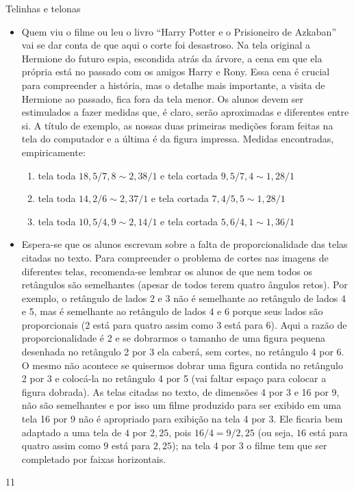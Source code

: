 \begin{sugestions}{Telinhas e telonas}
{
\begin{itemize}
\item Quem viu o filme ou leu o livro “Harry Potter e o Prisioneiro de Azkaban” vai se dar conta de que aqui o corte foi desastroso. Na tela original a Hermione do futuro espia, escondida atrás da árvore, a cena em que ela própria está no passado com os amigos Harry e Rony. Essa cena é crucial para compreender a história, mas o detalhe mais importante, a visita de Hermione ao passado, fica fora da tela menor. Os alunos devem ser estimulados a fazer medidas que, é claro, serão aproximadas e diferentes entre si. A título de exemplo, as nossas duas primeiras medições foram feitas na tela do computador e a última é da figura impressa. Medidas encontradas, empiricamente: 
\begin{enumerate}
\item tela toda $18{,}5/7{,}8\sim2{,}38/1$ e tela cortada $9{,}5/7{,}4\sim1{,}28/1$
\item tela toda $14{,}2/6\sim2{,}37/1$ e tela cortada $7{,}4/5{,}5\sim1{,}28/1$
\item tela toda $10{,}5/4{,}9\sim2{,}14/1$ e tela cortada $5{,}6/4{,}1\sim1{,}36/1$
\end{enumerate}

\item Espera-se que os alunos escrevam sobre a falta de proporcionalidade das telas citadas no texto. Para compreender o problema de cortes nas imagens de diferentes telas, recomenda-se lembrar os alunos de que nem todos os retângulos são semelhantes (apesar de todos terem quatro ângulos retos). Por exemplo, o retângulo de lados 2 e 3 não é semelhante ao retângulo de lados 4 e 5, mas é semelhante ao retângulo de lados 4 e 6 porque seus lados são proporcionais (2 está para quatro assim como 3 está para 6). Aqui a razão de proporcionalidade é 2 e se dobrarmos o tamanho de uma figura pequena desenhada no retângulo 2 por 3 ela caberá, sem cortes, no retângulo 4 por 6. O mesmo não acontece se quisermos dobrar uma figura contida no retângulo 2 por 3 e colocá-la no retângulo 4 por 5 (vai faltar espaço para colocar a figura dobrada). As telas citadas no texto, de dimensões 4 por 3 e 16 por 9, não são semelhantes e por isso um filme produzido para ser exibido em uma tela 16 por 9 não é apropriado para exibição na tela 4 por 3. Ele ficaria bem adaptado a uma tela de $4$ por $2{,}25$, pois $16/4=9/2{,}25$ (ou seja, $16$ está para quatro assim como $9$ está para $2{,}25$); na tela 4 por 3 o filme tem que ser completado por faixas horizontais.   
\end{itemize}
}{1}{1}
\end{sugestions}
